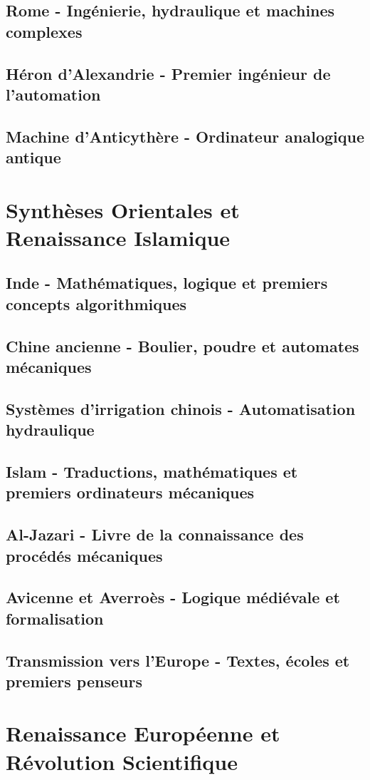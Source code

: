 \documentclass[12pt,a4paper]{book}
\begin{document}
\section{Rome - Ingénierie, hydraulique et machines complexes}
\section{Héron d'Alexandrie - Premier ingénieur de l'automation}
\section{Machine d'Anticythère - Ordinateur analogique antique}

\chapter{Synthèses Orientales et Renaissance Islamique}
\section{Inde - Mathématiques, logique et premiers concepts algorithmiques}
\section{Chine ancienne - Boulier, poudre et automates mécaniques}
\section{Systèmes d'irrigation chinois - Automatisation hydraulique}
\section{Islam - Traductions, mathématiques et premiers ordinateurs mécaniques}
\section{Al-Jazari - Livre de la connaissance des procédés mécaniques}
\section{Avicenne et Averroès - Logique médiévale et formalisation}
\section{Transmission vers l'Europe - Textes, écoles et premiers penseurs}

\chapter{Renaissance Européenne et Révolution Scientifique}
\end{document}
